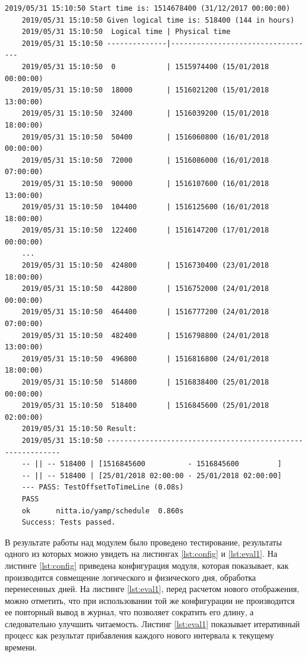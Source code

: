 \begin{lstlisting}[caption={Пример прямого расчета модулем},label={lst:eval1}]
	2019/05/31 15:10:50 Start time is: 1514678400 (31/12/2017 00:00:00)
	2019/05/31 15:10:50 Given logical time is: 518400 (144 in hours)
	2019/05/31 15:10:50  Logical time | Physical time
	2019/05/31 15:10:50 --------------|----------------------------------
	2019/05/31 15:10:50  0            | 1515974400 (15/01/2018 00:00:00)
	2019/05/31 15:10:50  18000        | 1516021200 (15/01/2018 13:00:00)
	2019/05/31 15:10:50  32400        | 1516039200 (15/01/2018 18:00:00)
	2019/05/31 15:10:50  50400        | 1516060800 (16/01/2018 00:00:00)
	2019/05/31 15:10:50  72000        | 1516086000 (16/01/2018 07:00:00)
	2019/05/31 15:10:50  90000        | 1516107600 (16/01/2018 13:00:00)
	2019/05/31 15:10:50  104400       | 1516125600 (16/01/2018 18:00:00)
	2019/05/31 15:10:50  122400       | 1516147200 (17/01/2018 00:00:00)
	...
	2019/05/31 15:10:50  424800       | 1516730400 (23/01/2018 18:00:00)
	2019/05/31 15:10:50  442800       | 1516752000 (24/01/2018 00:00:00)
	2019/05/31 15:10:50  464400       | 1516777200 (24/01/2018 07:00:00)
	2019/05/31 15:10:50  482400       | 1516798800 (24/01/2018 13:00:00)
	2019/05/31 15:10:50  496800       | 1516816800 (24/01/2018 18:00:00)
	2019/05/31 15:10:50  514800       | 1516838400 (25/01/2018 00:00:00)
	2019/05/31 15:10:50  518400       | 1516845600 (25/01/2018 02:00:00)
	2019/05/31 15:10:50 Result:
	2019/05/31 15:10:50 -----------------------------------------------------------
	-- || -- 518400 | [1516845600          - 1516845600         ]
	-- || -- 518400 | [25/01/2018 02:00:00 - 25/01/2018 02:00:00]
	--- PASS: TestOffsetToTimeLine (0.08s)
	PASS
	ok  	nitta.io/yamp/schedule	0.860s
	Success: Tests passed.
\end{lstlisting}

\indent В результате работы над модулем было проведено тестирование, результаты одного из которых можно увидеть на листингах \ref{lst:config} и \ref{lst:eval1}.
На листинге \ref{lst:config} приведена конфигурация модуля, которая показывает, как производится совмещение логического и физического дня, обработка перенесенных дней.
На листинге \ref{lst:eval1}, перед расчетом нового отображения, можно отметить, что при использовании той же конфигурации не производится ее повторный вывод в журнал, что позволяет сократить его длину, а следовательно улучшить читаемость.
Листинг \ref{lst:eval1} показывает итеративный процесс как результат прибавления каждого нового интервала к текущему времени.

